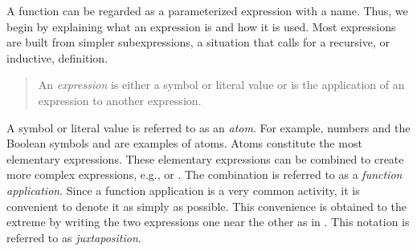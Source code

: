 A function can be regarded as a parameterized expression with a name.
Thus, we begin by explaining what an expression is and
how it is used.
Most expressions are built from simpler subexpressions,
a situation that calls for a recursive, or inductive, definition.
%
\begin{quote}
An \emph{expression}
is either a symbol or literal value or
is the application of an expression to another expression.
\end{quote}
%
A symbol or literal value is referred to as an \emph{atom}.
For example, numbers and the Boolean symbols 
and  are examples of atoms.
Atoms constitute the most elementary expressions.
These elementary expressions can be combined to create
more complex expressions, e.g.,  or
.
The combination is referred to as a
\emph{function application}.
Since a function application is a very common activity,
it is convenient to denote it as simply as possible.
This convenience is obtained to the extreme by writing the two expressions one
near the other as in .
This notation is referred to as \emph{juxtaposition}.

